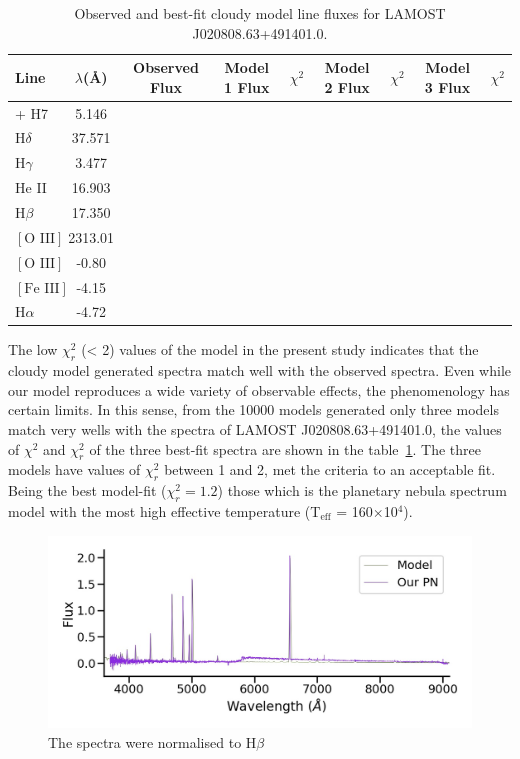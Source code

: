 \documentclass[fleqn,usenatbib]{mnras}
\begin{document}
{%
\begin{table}
	\centering
	\caption{Observed and best-fit {\sc cloudy}  model line fluxes for LAMOST J020808.63+491401.0.}
	\label{tab:abundances}
	\begin{tabular}{lcccccccc} %
                \hline
		\hline
		Line & $\lambda$(\AA) & Observed Flux  & Model 1 Flux & $\chi^{2}$ & Model 2 Flux &  $\chi^{2}$ & Model 3 Flux &  $\chi^{2}$ \\
		\hline
		[Ne III] + H7  & 5.146 \\
		H{$\delta$} & 37.571 \\
		H{$\gamma$}  & 3.477 \\
                He II & 16.903 \\
                H{$\beta$} & 17.350 \\
                $[\text{O III}]$ & 2313.01 \\
                $[\text{O III}]$ & -0.80 \\
                $[\text{Fe III}]$ & -4.15 \\
                H{$\alpha$} & -4.72 
                \hline
	\end{tabular}
\end{table}

The low $\chi^{2}_{r}$
 (< 2) values of the model in the present study indicates
that the {\sc cloudy} model generated spectra match well with
the observed spectra. Even while our model reproduces a wide variety
of observable effects, the phenomenology has certain limits.
In this sense, from the 10000 models generated only three models
match very wells with the spectra of  LAMOST J020808.63+491401.0,
the values of $\chi^{2}$ and $\chi^{2}_{r}$ of the three best-fit spectra
are shown in the table~\ref{tab:abundances}. The three
models have values of $\chi^{2}_{r}$ between 1 and 2, met
the criteria to an acceptable fit. Being the best model-fit ($\chi^{2}_{r} = 1.2$)
those which is the  planetary nebula spectrum model with the
most high effective temperature (T$_{\text{eff}}$ = 160$\times$10$^{4}$).

\begin{figure}
\centering
  \includegraphics[width=0.89\linewidth]{Figs/model_140000_37.57.jpg}
  \caption{The spectra were normalised to H{$\beta$}} 
  \label{fig:spectra-obs-model}
\end{figure}

}
\end{document}
